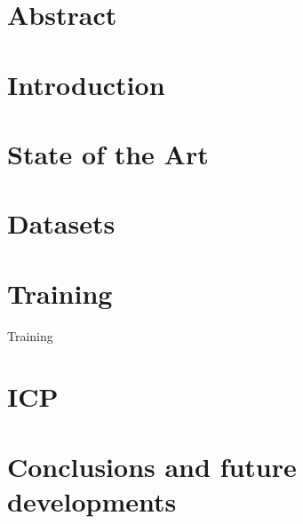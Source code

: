 \documentclass{report}
\begin{document}


\chapter*{Abstract}


\tableofcontents

\chapter{Introduction}


\chapter{State of the Art}


\chapter{Datasets}


\chapter{Training}
Training

\chapter{ICP}

\chapter{Conclusions and future developments}

\end{document}
